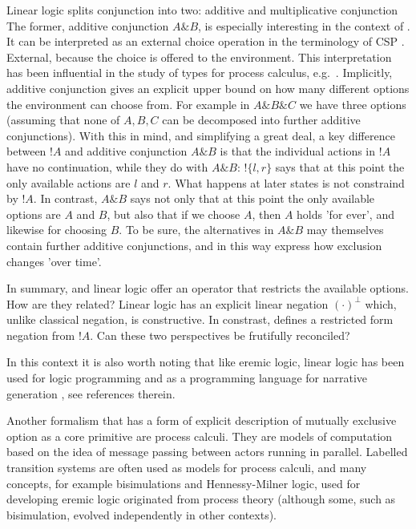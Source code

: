 Linear logic splits conjunction into two: additive and multiplicative
conjunction The former, additive conjunction $A \& B$, is especially
interesting in the context of \ELFULL{}. It can be interpreted
\cite{AbramskyS:comintoll} as an external choice operation in the
terminology of CSP \cite{HoareC:comseq}. External, because the choice
is offered to the environment.  This interpretation has been
influential in the study of types for process calculus,
e.g.~\cite{HondaK:unitypsfsifLONG,TakeuchiK:intbaslaits,HondaK:lanpriatdfscbp}.
Implicitly, additive conjunction gives an explicit upper bound on how
many different options the environment can choose from. For example in
$A \& B \& C$ we have three options (assuming that none of $A, B, C$
can be decomposed into further additive conjunctions).  With this in
mind, and simplifying a great deal, a key difference between $!A$ and
additive conjunction $A \& B$ is that the individual actions in $!A$
have no continuation, while they do with $A \& B$: $!\{l, r\}$ says
that at this point the only available actions are $l$ and $r$. What
happens at later states is not constraind by $!A$.  In contrast, $A \&
B$ says not only that at this point the only available options are $A$
and $B$, but also that if we choose $A$, then $A$ holds 'for ever',
and likewise for choosing $B$. To be sure, the alternatives in $A \&
B$ may themselves contain further additive conjunctions, and in this
way express how exclusion changes 'over time'.

In summary, \ELABR{} and linear logic offer an operator that restricts
the available options. How are they related? Linear logic has an
explicit linear negation $(\cdot)^{\bot}$ which, unlike classical
negation, is constructive. In constrast, \ELABR{} defines a restricted
form negation from $!A$. Can these two perspectives be frutifully
reconciled?

In this context it is also worth noting that like eremic logic, linear
logic has been used for logic programming
\cite{HodasJS:logproiafoill,WinikoffMD:logprowll,PymDJ:uniprotiollp,HarlandJ:prolygao,MillerD:surlinlp}
and as a programming language for narrative generation
\cite{BosserAG:linlogpfng}, see references therein.

Another formalism that has a form of explicit description of mutually
exclusive option as a core primitive are process calculi. They are
models of computation based on the idea of message passing between
actors running in parallel. Labelled transition systems are often used
as models for process calculi, and many concepts, for example
bisimulations and Hennessy-Milner logic, used for developing eremic
logic originated from process theory (although some, such as
bisimulation, evolved independently in other contexts).


